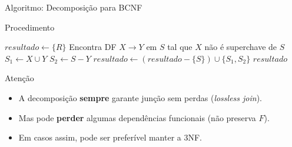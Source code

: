 \documentclass[9pt]{beamer}
\begin{document}
\begin{frame}{Algoritmo: Decomposição para BCNF}
\small
\begin{block}{Procedimento}
\begin{algorithmic}[1]
  \State $resultado \gets \{R\}$
    \State Encontra DF $X \to Y$ em $S$ tal que $X$ não é superchave de $S$
    \State $S_1 \gets X \cup Y$ 
    \State $S_2 \gets S - Y$ 
    \State $resultado \gets (resultado - \{S\}) \cup \{S_1, S_2\}$
  \EndWhile
  \State \Return $resultado$
\EndProcedure
\end{algorithmic}
\end{block}

\vspace{0.2cm}
\begin{alertblock}{Atenção}
\begin{itemize}
  \item A decomposição \textbf{sempre} garante junção sem perdas (\textit{lossless join}).
  \item Mas pode \textbf{perder} algumas dependências funcionais (não preserva $F$).
  \item Em casos assim, pode ser preferível manter a 3NF.
\end{itemize}
\end{alertblock}
\end{frame}
\end{document}
